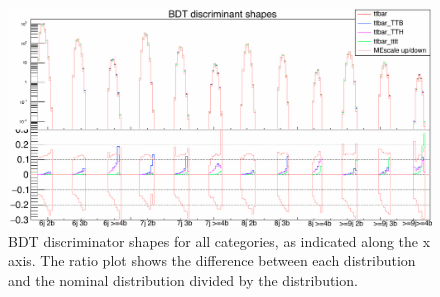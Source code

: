 \begin{figure}[ht]
\centering
    \includegraphics[width=\textwidth]{images/Run2/ttbarShapesLabels.png}
    \caption{BDT discriminator shapes for all categories, as indicated along the x axis. The ratio plot shows the difference between each distribution and the nominal \ttbar distribution divided by the \ttbar distribution.}
    \label{fig:TTB}
\end{figure}

